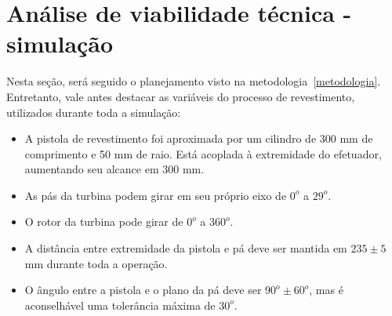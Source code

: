 \section{Análise de viabilidade técnica - simulação}

Nesta seção, será seguido o planejamento visto na metodologia~\ref{metodologia}.
Entretanto, vale antes destacar as variáveis do processo de revestimento,
utilizados durante toda a simulação:

\begin{itemize}
  \item A pistola de revestimento foi aproximada por um cilindro de 300 mm de
  comprimento e 50 mm de raio. Está acoplada à extremidade do efetuador,
  aumentando seu alcance em 300 mm.
  \item As pás da turbina podem girar em seu próprio eixo de $0^o$ a $29^o$.
  \item O rotor da turbina pode girar de $0^o$ a $360^o$.
  \item A distância entre extremidade da pistola e pá deve ser mantida em $235
  \pm 5$ mm durante toda a operação.
  \item O ângulo entre a pistola e o plano da pá deve ser $90^o \pm 60^o$, mas
  é aconselhável uma tolerância máxima de $30^o$.
\end{itemize}





